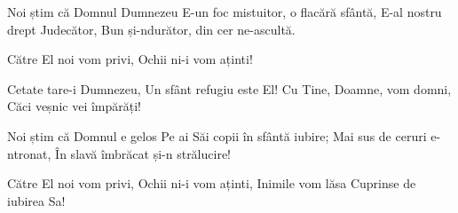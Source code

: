 \beginverse
Noi știm că Domnul Dumnezeu
E-un foc mistuitor, o flacără sfântă,
E-al nostru drept Judecător,
Bun și-ndurător, din cer ne-ascultă.
\endverse

\beginchorus
Către El noi vom privi,
Ochii ni-i vom aținti!
\endchorus

\beginverse
Cetate tare-i Dumnezeu,
Un sfânt refugiu este El!
Cu Tine, Doamne, vom domni,
Căci veșnic vei împărăți!
\endverse

\beginverse
Noi știm că Domnul e gelos
Pe ai Săi copii în sfântă iubire;
Mai sus de ceruri e-ntronat,
În slavă îmbrăcat și-n strălucire!
\endverse

\beginchorus
Către El noi vom privi,
Ochii ni-i vom aținti,
Inimile vom lăsa
Cuprinse de iubirea Sa!
\endchorus
\endsong